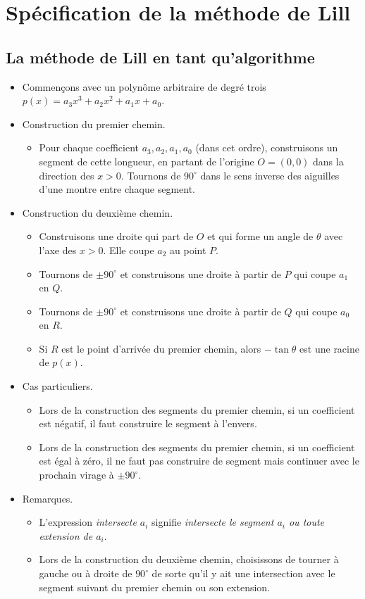 \section{Spécification de la méthode de Lill}\label{s.method}

\subsection{La méthode de Lill en tant qu'algorithme}

\begin{itemize}
\item Commençons avec un polynôme 
 arbitraire  de degré trois $p(x)=a_3x^3+a_2x^2+a_1x+a_0$.
\item Construction du premier chemin.
\begin{itemize}
\item Pour chaque coefficient $a_3,a_2,a_1,a_0$ (dans cet ordre), construisons un segment  de cette longueur, en partant de l'origine $O=(0,0)$ dans la direction des $x>0$. Tournons de  $90^\circ$ dans le sens inverse des aiguilles d'une montre entre chaque segment.
\end{itemize}
\item Construction du deuxième chemin.
\begin{itemize}
\item Construisons une droite qui part de $O$ et qui forme un angle de $\theta$ avec l'axe des $x>0$. Elle  coupe $a_2$ au point $P$.
\item Tournons de $\pm 90^\circ$ et construisons une droite à partir de $P$ qui coupe $a_1$ en $Q$.
\item Tournons de $\pm 90^\circ$ et construisons une droite à partir de $Q$ qui coupe $a_0$ en $R$.
\item Si $R$ est le point d'arrivée du premier chemin, alors $-\tan\theta$ est une racine de $p(x)$.
\end{itemize}
\item Cas particuliers.
\begin{itemize}
\item Lors de la construction des segments du premier chemin, si un coefficient est négatif, il faut construire le segment à l'envers.
\item Lors de la construction des segments du premier chemin, si un coefficient est égal à zéro, il ne faut pas construire de segment  mais continuer avec le prochain virage à $\pm 90^\circ$.
\end{itemize}
\item Remarques.
\begin{itemize}
\item L'expression \emph{intersecte  $a_i$} signifie \emph{intersecte le segment  $a_i$ ou toute extension de $a_i$}.
\item Lors de la construction du deuxième chemin, choisissons de tourner à gauche ou à droite de $90^\circ$ de sorte qu'il y ait une intersection avec le segment suivant du premier chemin ou son extension.
\end{itemize}
\end{itemize}

